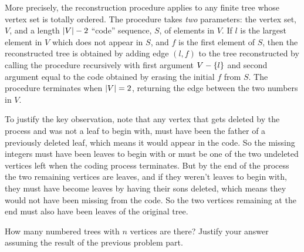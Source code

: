 \documentclass[12pt,twoside]{article}
\begin{document}
\begin{problem}[20 points]
{More precisely, the reconstruction procedure applies to any finite tree
whose vertex set is totally ordered.  The procedure takes \emph{two}
parameters: the vertex set, $V$, and a length $\left|V\right|-2$ ``code''
sequence, $S$, of elements in $V$.  If $l$ is the largest element in $V$
which does not appear in $S$, and $f$ is the first element of $S$, then
the reconstructed tree is obtained by adding edge $(l,f)$ to the tree
reconstructed by calling the procedure recursively with first argument
$V-\left\{l\right\}$ and second argument equal to the code obtained by erasing the
initial $f$ from $S$.  The procedure terminates when $\left|V\right|=2$,
returning the edge between the two numbers in $V$.


To justify the key observation, note that any vertex that gets deleted by
the process and was not a leaf to begin with, must have been the father of
a previously deleted leaf, which means it would appear in the code.  So
the missing integers must have been leaves to begin with or must be one of
the two undeleted vertices left when the coding process terminates.  But
by the end of the process the two remaining vertices are leaves, and if
they weren't leaves to begin with, they must have become leaves by having
their sons deleted, which means they would not have been missing from the
code.  So the two vertices remaining at the end must also have been leaves
of the original tree.
}

\ppart How many numbered trees with $n$ vertices are there?  Justify
your answer assuming the result of the previous problem part.


\eparts
\end{problem}
\fi
\end{document}
